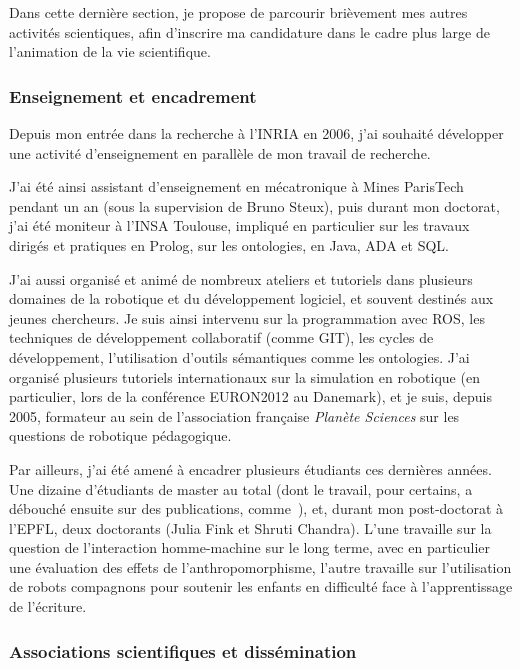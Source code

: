 \documentclass[a4paper]{article}
\begin{document}
Dans cette dernière section, je propose de parcourir brièvement mes autres
activités scientiques, afin d'inscrire ma candidature dans le cadre plus large
de l'animation de la vie scientifique.

\subsubsection{Enseignement et encadrement}

Depuis mon entrée dans la recherche à l'INRIA en 2006, j'ai souhaité développer une
activité d'enseignement en parallèle de mon travail de recherche.

J'ai été ainsi assistant d'enseignement en mécatronique à Mines ParisTech
pendant un an (sous la supervision de Bruno Steux), puis durant mon doctorat,
j'ai été moniteur à l'INSA Toulouse, impliqué en particulier sur les travaux
dirigés et pratiques en Prolog, sur les ontologies, en Java, ADA et SQL.

J'ai aussi organisé et animé de nombreux ateliers et tutoriels dans plusieurs
domaines de la robotique et du développement logiciel, et souvent destinés aux
jeunes chercheurs. Je suis ainsi intervenu sur la programmation avec ROS, les
techniques de développement collaboratif (comme GIT), les cycles de
développement, l'utilisation d'outils sémantiques comme les ontologies. J'ai
organisé plusieurs tutoriels internationaux sur la simulation en robotique (en
particulier, lors de la conférence EURON2012 au Danemark), et je suis, depuis
2005, formateur au sein de l'association française \emph{Planète Sciences} sur
les questions de robotique pédagogique.

Par ailleurs, j'ai été amené à encadrer plusieurs étudiants ces dernières
années. Une dizaine d'étudiants de master au total (dont le travail, pour
certains, a débouché ensuite sur des publications, comme~\cite{Lemaignan2011a}),
et, durant mon post-doctorat à l'EPFL, deux doctorants (Julia Fink et Shruti
Chandra). L'une travaille sur la question de l'interaction homme-machine sur le
long terme, avec en particulier une évaluation des effets de
l'anthropomorphisme, l'autre travaille sur l'utilisation de robots compagnons
pour soutenir les enfants en difficulté face à l'apprentissage de l'écriture.

\subsubsection{Associations scientifiques et dissémination}
\end{document}
